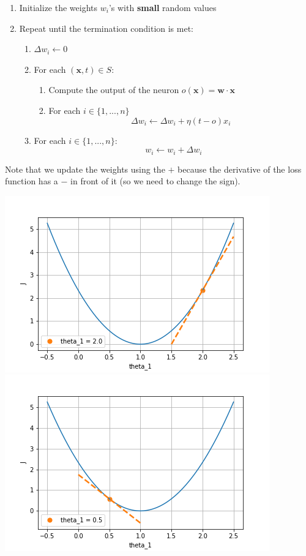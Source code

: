 \begin{enumerate}
    \item Initialize the weights $w_{i}$'s with \textbf{small} random values
    \item Repeat until the termination condition is met:
    \begin{enumerate}
        \item $\Delta w_{i} \leftarrow 0$
        \item For each $(\textbf{x},t) \in S$:
        \begin{enumerate}
            \item Compute the output of the neuron $o(\textbf{x}) = \textbf{w} \cdot \textbf{x}$
            \item For each $i \in \{1,...,n\}$
            \[\Delta w_{i} \leftarrow \Delta w_{i} + \eta (t - o)x_{i}\]
        \end{enumerate}
        \item For each $i \in \{1,...,n\}$:
        \[w_{i} \leftarrow w_{i} + \Delta w_{i}\]
    \end{enumerate}
\end{enumerate}
Note that we update the weights using the $+$ because the derivative of the loss function has a $-$ in front of it (so we need to change the sign).
\begin{flushleft}
    \includegraphics[scale=0.5]{images/partial derivative.png}
    \includegraphics[scale=0.5]{images/partial derivative_1.png}
\end{flushleft}
